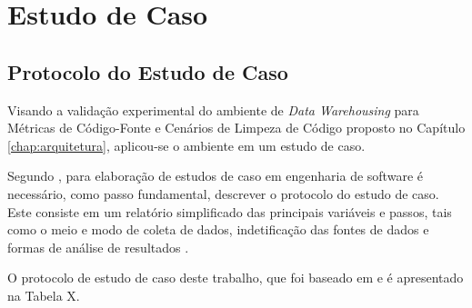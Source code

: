 \chapter{Estudo de Caso}
\label{estudo de caso}

\section{Protocolo do Estudo de Caso}
Visando a validação experimental do ambiente de \textit{Data Warehousing} para Métricas de Código-Fonte e Cenários de Limpeza de Código proposto no Capítulo \ref{chap:arquitetura}, aplicou-se o ambiente em um estudo de caso. 

Segundo , para elaboração de estudos de caso em engenharia de software é necessário, como passo fundamental, descrever o protocolo do estudo de caso. Este consiste em um relatório simplificado das principais variáveis e passos, tais como o meio e modo de coleta de dados, indetificação das fontes de dados e formas de análise de resultados \cite{wohlin2012experimentation}. 

O protocolo de estudo de caso deste trabalho, que foi baseado em  e  é apresentado na Tabela X.


